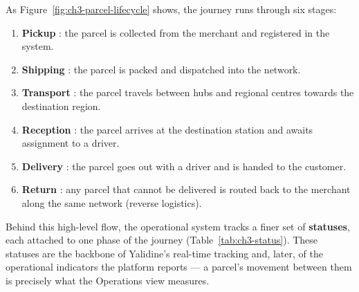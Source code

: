 As Figure~\ref{fig:ch3-parcel-lifecycle} shows, the journey runs through six stages:

\begin{enumerate}[noitemsep, label=\textbf{\arabic*.}]
    \item \textbf{Pickup} : the parcel is collected from the merchant and registered in the system.
    \item \textbf{Shipping} : the parcel is packed and dispatched into the network.
    \item \textbf{Transport} : the parcel travels between hubs and regional centres towards the
          destination region.
    \item \textbf{Reception} : the parcel arrives at the destination station and awaits assignment
          to a driver.
    \item \textbf{Delivery} : the parcel goes out with a driver and is handed to the customer.
    \item \textbf{Return} : any parcel that cannot be delivered is routed back to the merchant
          along the same network (reverse logistics).
\end{enumerate}

Behind this high-level flow, the operational system tracks a finer set of \textbf{statuses}, each
attached to one phase of the journey (Table~\ref{tab:ch3-status}). These statuses are the backbone of
Yalidine's real-time tracking and, later, of the operational indicators the platform reports --- a
parcel's movement between them is precisely what the Operations view measures.

